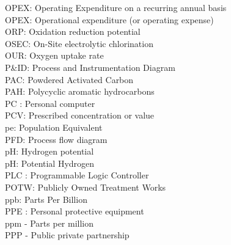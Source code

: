 \documentclass{article}
\begin{document}
OPEX:  Operating Expenditure on a recurring annual basis
\vspace{0.3cm}\\
OPEX:  Operational expenditure (or operating expense)
\vspace{0.3cm}\\
ORP:  Oxidation reduction potential
\vspace{0.3cm}\\
OSEC:  On-Site electrolytic chlorination
\vspace{0.3cm}\\
OUR:  Oxygen uptake rate
\vspace{0.3cm}\\
P\&ID: Process and Instrumentation Diagram
\vspace{0.3cm}\\
PAC:  Powdered Activated Carbon
\vspace{0.3cm}\\
PAH:  Polycyclic aromatic hydrocarbons
\vspace{0.3cm}\\
PC :  Personal computer
\vspace{0.3cm}\\
PCV:  Prescribed concentration or value
\vspace{0.3cm}\\
pe:  Population Equivalent
\vspace{0.3cm}\\
PFD:  Process flow diagram
\vspace{0.3cm}\\
pH:  Hydrogen potential
\vspace{0.3cm}\\
pH: Potential Hydrogen
\vspace{0.3cm}\\
PLC :  Programmable Logic Controller
\vspace{0.3cm}\\
POTW:  Publicly Owned Treatment Works
\vspace{0.3cm}\\
ppb: Parts Per Billion
\vspace{0.3cm}\\
PPE :  Personal protective equipment  
\vspace{0.3cm}\\
ppm - Parts per million
\vspace{0.3cm}\\
PPP - Public private partnership
\vspace{0.3cm}\\
\end{document}
